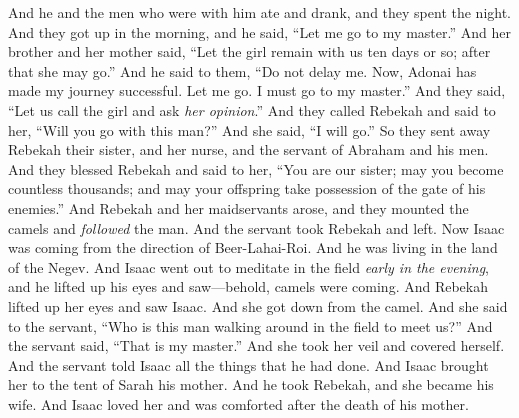 \begin{biblechapter}
\verse And he and the men who were with him ate and drank, and they spent the night. And they got up in the morning, and he said, “Let me go to my master.”
\verse And her brother and her mother said, “Let the girl remain with us ten days or so; after that she may go.”
\verse And he said to them, “Do not delay me. Now, Adonai has made my journey successful. Let me go. I must go to my master.”
\verse And they said, “Let us call the girl and ask \textit{her opinion}.”
\verse And they called Rebekah and said to her, “Will you go with this man?” And she said, “I will go.”
\verse So they sent away Rebekah their sister, and her nurse, and the servant of Abraham and his men.
\verse And they blessed Rebekah and said to her, “You are our sister; may you become countless thousands; and may your offspring take possession of the gate of his enemies.”
\verse And Rebekah and her maidservants arose, and they mounted the camels and \textit{followed} the man. And the servant took Rebekah and left.
\verse Now Isaac was coming from the direction of Beer-Lahai-Roi. And he was living in the land of the Negev.
\verse And Isaac went out to meditate in the field \textit{early in the evening}, and he lifted up his eyes and saw—behold, camels were coming.
\verse And Rebekah lifted up her eyes and saw Isaac. And she got down from the camel.
\verse And she said to the servant, “Who is this man walking around in the field to meet us?” And the servant said, “That is my master.” And she took her veil and covered herself.
\verse And the servant told Isaac all the things that he had done.
\verse And Isaac brought her to the tent of Sarah his mother. And he took Rebekah, and she became his wife. And Isaac loved her and was comforted after the death of his mother.
\end{biblechapter}


